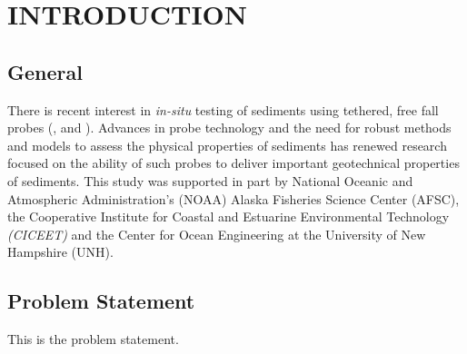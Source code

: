 \chapter{INTRODUCTION}              %
\section{General}
\par \indent
There is recent interest in \emph{in-situ} testing of sediments using tethered, free fall probes (\citet{stoll99}, \citet{aubeny06} and \citet{stoll06}). Advances in probe technology and the need for robust methods and models to assess the physical properties of sediments has renewed research focused on the ability of such probes to deliver important geotechnical properties of sediments. This study was supported in part by National Oceanic and Atmospheric Administration's (NOAA) Alaska Fisheries Science Center (AFSC), the Cooperative Institute for Coastal and Estuarine Environmental Technology \emph{(CICEET)} and the Center for Ocean Engineering at the University of New Hampshire (UNH).
\section{Problem Statement}
\par \indent
This is the problem statement.